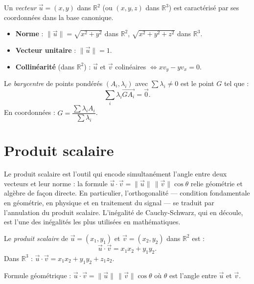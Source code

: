 \documentclass[11pt,a4paper,twoside]{book}
\newcommand{\R}{\mathbb{R}}
\begin{document}
\begin{definitionbox}
Un \emph{vecteur} $\vec{u} = (x,y)$ dans $\R^2$ (ou $(x,y,z)$ dans $\R^3$) est caractérisé par ses coordonnées dans la base canonique.
\begin{itemize}
  \item \textbf{Norme} : $\|\vec{u}\| = \sqrt{x^2+y^2}$ dans $\R^2$, $\sqrt{x^2+y^2+z^2}$ dans $\R^3$.
  \item \textbf{Vecteur unitaire} : $\|\vec{u}\|=1$.
  \item \textbf{Collinéarité} (dans $\R^2$) : $\vec{u}$ et $\vec{v}$ colinéaires $\iff xv_y - yv_x = 0$.
\end{itemize}
\end{definitionbox}

\begin{definitionbox}[Barycentre]
Le \emph{barycentre} de points pondérés $(A_i, \lambda_i)$ avec $\sum\lambda_i \neq 0$ est le point $G$ tel que :
\[
  \sum_{i} \lambda_i \overrightarrow{GA_i} = \vec{0}.
\]
En coordonnées : $G = \dfrac{\sum \lambda_i A_i}{\sum \lambda_i}$.
\end{definitionbox}

\section{Produit scalaire}

Le produit scalaire est l'outil qui encode simultanément l'angle entre deux vecteurs et leur norme : la formule $\vec{u} \cdot \vec{v} = \|\vec{u}\|\,\|\vec{v}\|\cos\theta$ relie géométrie et algèbre de façon directe. En particulier, l'orthogonalité — condition fondamentale en géométrie, en physique et en traitement du signal — se traduit par l'annulation du produit scalaire. L'inégalité de Cauchy-Schwarz, qui en découle, est l'une des inégalités les plus utilisées en mathématiques.

\begin{definitionbox}[Produit scalaire dans $\R^n$]
Le \emph{produit scalaire} de $\vec{u}=(x_1,y_1)$ et $\vec{v}=(x_2,y_2)$ dans $\R^2$ est :
\[
  \vec{u}\cdot\vec{v} = x_1x_2 + y_1y_2.
\]
Dans $\R^3$ : $\vec{u}\cdot\vec{v} = x_1x_2+y_1y_2+z_1z_2$.

Formule géométrique : $\vec{u}\cdot\vec{v} = \|\vec{u}\|\,\|\vec{v}\|\cos\theta$ où $\theta$ est l'angle entre $\vec{u}$ et $\vec{v}$.
\end{definitionbox}
\end{document}
